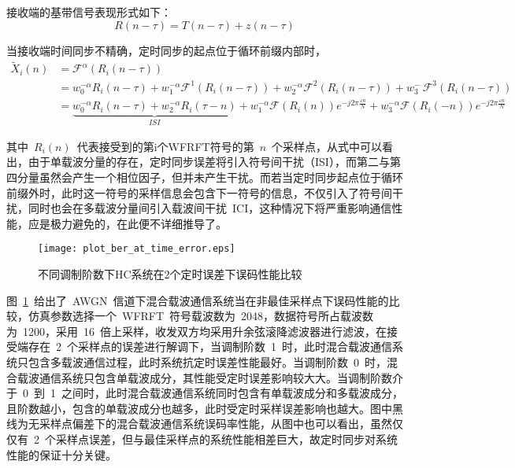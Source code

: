 接收端的基带信号表现形式如下：
\begin{equation}
R(n-\tau) = T(n-\tau) + z(n-\tau)
\end{equation}

当接收端时间同步不精确，定时同步的起点位于循环前缀内部时，
\begin{align}\label{}
\tilde X_i(n) &= {\mathcal{F}^\alpha }\left ( R_i\left ( n-\tau \right ) \right ) \nonumber \\
&= w_0^{- \alpha }R_i(n-\tau) + w_1^{- \alpha }{{\mathcal{F}^1}\left ( R_i\left ( n-\tau \right ) \right )}
+ w_2^{- \alpha }{{\mathcal{F}^2}\left ( R_i\left ( n-\tau \right ) \right )}
+ w_3^{- \ }{{\mathcal{F}^3}\left ( R_i\left ( n-\tau \right ) \right )} \nonumber \\
&= \underbrace {w_0^{- \alpha }R_i(n-\tau) + w_2^{- \alpha }R_i(\tau -n)}_{ISI} + w_1^{- \alpha }{{\mathcal{F}}\left ( R_i\left ( n \right ) \right )} {e^{-j2\pi \frac{{\varepsilon n}}{N}}} + w_3^{- \alpha }{{\mathcal{F}}\left ( R_i\left ( -n \right ) \right )} {e^{-j2\pi \frac{{\varepsilon n}}{N}}}
\end{align}

其中~$R_i(n)$~代表接受到的第i个WFRFT符号的第~$n$~个采样点，从式中可以看出，由于单载波分量的存在，定时同步误差将引入符号间干扰（ISI），而第二与第四分量虽然会产生一个相位因子，但并未产生干扰。而若当定时同步起点位于循环前缀外时，此时这一符号的采样信息会包含下一符号的信息，不仅引入了符号间干扰，同时也会在多载波分量间引入载波间干扰~ICI，这种情况下将严重影响通信性能，应是极力避免的，在此便不详细推导了。
\begin{figure}[htbp]
\centering
\texttt{[image: plot\_ber\_at\_time\_error.eps]}
\caption{不同调制阶数下HC系统在2个定时误差下误码性能比较}\vspace{-1em}\label{plot_ber_at_time_error}
\end{figure}

图~\ref{plot_ber_at_time_error}~给出了~AWGN~信道下混合载波通信系统当在非最佳采样点下误码性能的比较，仿真参数选择一个~WFRFT~符号载波数为~2048，数据符号所占载波数为~1200，采用~16~倍上采样，收发双方均采用升余弦滚降滤波器进行滤波，在接受端存在~2~个采样点的误差进行解调下，当调制阶数~1~时，此时混合载波通信系统只包含多载波通信过程，此时系统抗定时误差性能最好。当调制阶数~0~时，混合载波通信系统只包含单载波成分，其性能受定时误差影响较大大。当调制阶数介于~0~到~1~之间时，此时混合载波通信系统同时包含有单载波成分和多载波成分，且阶数越小，包含的单载波成分也越多，此时受定时采样误差影响也越大。图中黑线为无采样点偏差下的混合载波通信系统误码率性能，从图中也可以看出，虽然仅仅有~2~个采样点误差，但与最佳采样点的系统性能相差巨大，故定时同步对系统性能的保证十分关键。


